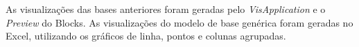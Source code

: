 \documentclass[
	12pt,				%
	openright,			%
	oneside,			%
	a4paper,			%
	english,			%
	brazil				%
	]{abntex2}
\begin{document}




	As visualizações das bases anteriores foram geradas pelo \emph{VisApplication} e o \emph{Preview} do Blocks.
	As visualizações do modelo de base genérica foram geradas no Excel, utilizando os gráficos de linha, pontos e colunas agrupadas.
	\par
	\par


\end{document}
